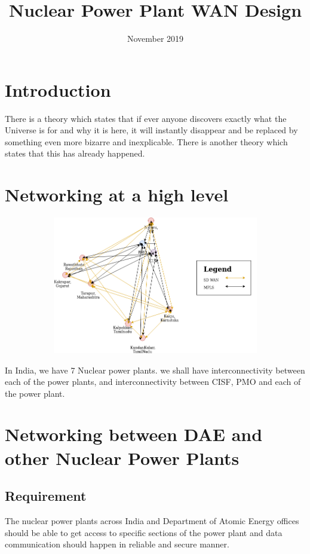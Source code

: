 \documentclass{article}
\title{Nuclear Power Plant WAN Design}
\date{November 2019}
\begin{document}
\maketitle

\section{Introduction}
There is a theory which states that if ever anyone discovers exactly what the Universe is for and why it is here, it will instantly disappear and be replaced by something even more bizarre and inexplicable.
There is another theory which states that this has already happened.
\section{Networking at a high level}
\begin{figure}[htb]
	\centering
	\includegraphics[width=12cm,height=6cm]{ass1.png}
\end{figure}
In India, we have 7 Nuclear power plants. we shall have interconnectivity between each of the power plants, and interconnectivity between CISF, PMO and each of the power plant.

\section{Networking between DAE and other Nuclear Power Plants}
\subsection{Requirement}
The nuclear power plants across India and Department of Atomic Energy offices should be able to get access to specific sections of the power plant and data communication should happen in reliable and secure manner.
\end{document}
